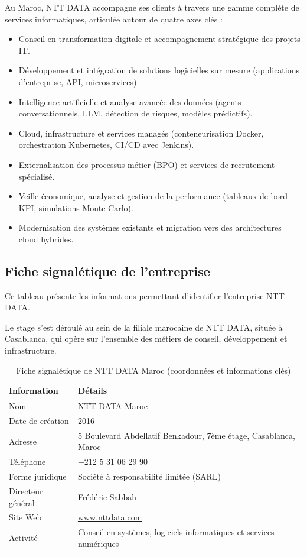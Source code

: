 Au Maroc, NTT DATA accompagne ses clients à travers une gamme complète de services informatiques, articulée autour de quatre axes clés :
\begin{itemize}
	\renewcommand{\labelitemi}{—}
	 \item Conseil en transformation digitale et accompagnement stratégique des projets IT.
    \item  Développement et intégration de solutions logicielles sur mesure (applications d’entreprise, API, microservices).
    \item  Intelligence artificielle et analyse avancée des données (agents conversationnels, LLM, détection de risques, modèles prédictifs).
    \item  Cloud, infrastructure et services managés (conteneurisation Docker, orchestration Kubernetes, CI/CD avec Jenkins).
    \item  Externalisation des processus métier (BPO) et services de recrutement spécialisé.
    \item  Veille économique, analyse et gestion de la performance (tableaux de bord KPI, simulations Monte Carlo).
    \item  Modernisation des systèmes existants et migration vers des architectures cloud hybrides.\end{itemize}

\subsection{Fiche signalétique de l’entreprise}
Ce tableau présente les informations permettant d’identifier l’entreprise NTT DATA.

Le stage s’est déroulé au sein de la filiale marocaine de NTT DATA, située à Casablanca, qui opère sur l’ensemble des métiers de conseil, développement et infrastructure.

\begin{table}[H]
	\centering
	\renewcommand{\arraystretch}{0.9}
	\caption{Fiche signalétique de NTT DATA Maroc (coordonnées et informations clés)}
	\begin{tabular}{|l|l|}
		\hline
		\textbf{Information} & \textbf{Détails} \\
		\hline
		Nom & NTT DATA Maroc \\
		\hline
		Date de création & 2016 \\
		\hline
		Adresse & 5 Boulevard Abdellatif Benkadour, 7ème étage, Casablanca, Maroc \\
		\hline
		Téléphone & +212 5 31 06 29 90 \\
		\hline
		Forme juridique & Société à responsabilité limitée (SARL) \\
		\hline
		Directeur général & Frédéric Sabbah \\
		\hline
		Site Web & \href{https://www.nttdata.com}{www.nttdata.com} \\
		\hline
		Activité & Conseil en systèmes, logiciels informatiques et services numériques \\
		\hline
	\end{tabular}
	\label{tab:fiche_ntt}
\end{table}


